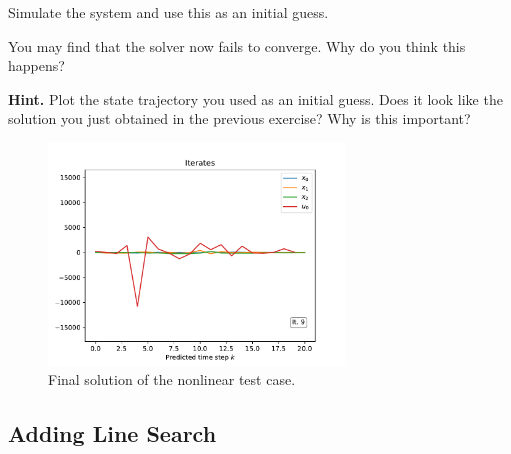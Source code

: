 \documentclass[]{article}
\begin{document}
\begin{assignment} \label{assgn:simulate-init}
   Simulate the system and use this as an initial guess.

   You may find that the solver now fails to converge. 
   Why do you think this happens? 
   
   \textbf{Hint.} Plot the state trajectory you used as an initial guess. 
   Does it look like the solution you just obtained in the previous exercise? 
   Why is this important?
\end{assignment}
\begin{figure}[H]
	\centering
	\includegraphics[width=0.7\textwidth]{images/Assignment6-3.pdf}
	\caption{Final solution of the nonlinear test case.}
	\label{fig:assignment6_3}
\end{figure}



\subsection{Adding Line Search}
\end{document}
